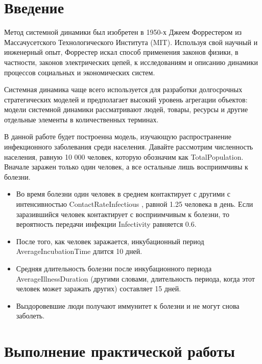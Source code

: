 \graphicspath{{./SecondTask/img/}} %

\section*{\LARGE Введение}
Метод системной динамики был изобретен в 1950-х Джеем Форрестером из
Массачусетского Технологического Института (MIT). Используя свой научный и
инженерный опыт, Форрестер искал способ применения законов физики, в
частности, законов электрических цепей, к исследованиям и описанию динамики
процессов социальных и экономических систем.\par
Системная динамика чаще всего используется для разработки долгосрочных
стратегических моделей и предполагает высокий уровень агрегации объектов:
модели системной динамики рассматривают людей, товары, ресурсы и другие
отдельные элементы в количественных терминах.\par
В данной работе будет построенна модель, изучающую распространение
инфекционного заболевания среди населения. Давайте рассмотрим численность
населения, равную 10 000 человек, которую обозначим как TotalPopulation.
Вначале заражен только один человек, а все остальные лишь восприимчивы
к болезни.

\begin{itemize}
	\item Во время болезни один человек в среднем контактирует с другими с
		интенсивностью ContactRateInfectious , равной 1.25 человека в день.
		Если заразившийся человек контактирует с восприимчивым к болезни,
		то вероятность передачи инфекции Infectivity равняется 0.6.
	\item После того, как человек заражается, инкубационный период
		AverageIncubationTime длится 10 дней.
	\item Средняя длительность болезни после инкубационного периода
		AverageIllnessDuration (другими словами, длительность периода, когда
		этот человек может заражать других) составляет 15 дней.
	\item Выздоровевшие люди получают иммунитет к болезни и не могут снова
		заболеть.
\end{itemize}


\clearpage

\section*{\LARGE Выполнение практической работы}

